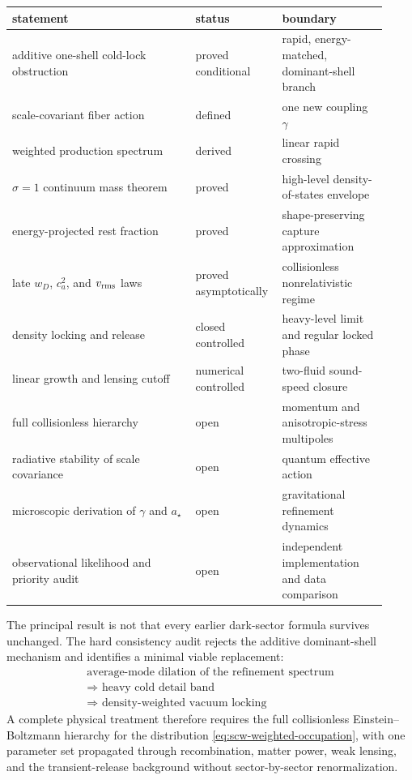 \begin{center}
\begin{tabular}{@{}>{\raggedright\arraybackslash}p{0.47\linewidth}>{\raggedright\arraybackslash}p{0.18\linewidth}>{\raggedright\arraybackslash}p{0.27\linewidth}@{}}
\toprule
statement & status & boundary\\
\midrule
additive one-shell cold-lock obstruction & proved conditional & rapid, energy-matched, dominant-shell branch\\
scale-covariant fiber action & defined & one new coupling $\gamma$\\
weighted production spectrum & derived & linear rapid crossing\\
$\sigma=1$ continuum mass theorem & proved & high-level density-of-states envelope\\
energy-projected rest fraction & proved & shape-preserving capture approximation\\
late $w_D$, $c_a^2$, and $v_{\rm rms}$ laws & proved asymptotically & collisionless nonrelativistic regime\\
density locking and release & closed controlled & heavy-level limit and regular locked phase\\
linear growth and lensing cutoff & numerical controlled & two-fluid sound-speed closure\\
full collisionless hierarchy & open & momentum and anisotropic-stress multipoles\\
radiative stability of scale covariance & open & quantum effective action\\
microscopic derivation of $\gamma$ and $a_\star$ & open & gravitational refinement dynamics\\
observational likelihood and priority audit & open & independent implementation and data comparison\\
\bottomrule
\end{tabular}
\end{center}

The principal result is not that every earlier dark-sector formula survives unchanged.  The hard consistency audit rejects the additive dominant-shell mechanism and identifies a minimal viable replacement:
\begin{equation}
 \boxed{
 \begin{gathered}
 \text{average-mode dilation of the refinement spectrum}\\
 \Longrightarrow \text{ heavy cold detail band}\\
 \Longrightarrow \text{ density-weighted vacuum locking}
 \end{gathered}}
 \label{eq:scw-result-chain}
\end{equation}
A complete physical treatment therefore requires the full collisionless Einstein--Boltzmann hierarchy for the distribution \eqref{eq:scw-weighted-occupation}, with one parameter set propagated through recombination, matter power, weak lensing, and the transient-release background without sector-by-sector renormalization.
